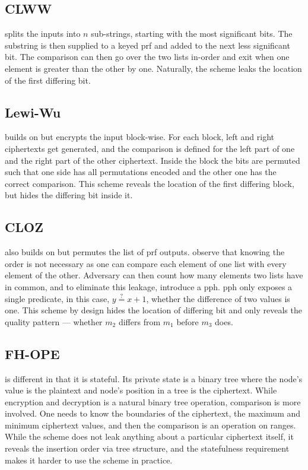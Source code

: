		\subsection{CLWW}

			\cite{practical-ore} splits the inputs into $n$ sub-strings, starting with the most significant bits.
			The substring is then supplied to a keyed \gls{prf} and added to the next less significant bit.
			The comparison can then go over the two lists in-order and exit when one element is greater than the other by one.
			Naturally, the scheme leaks the location of the first differing bit.

		\subsection{Lewi-Wu}

			\cite{lewi-wu-ore} builds on \cite{practical-ore} but encrypts the input block-wise.
			For each block, left and right ciphertexts get generated, and the comparison is defined for the left part of one and the right part of the other ciphertext.
			Inside the block the bits are permuted such that one side has all permutations encoded and the other one has the correct comparison.
			This scheme reveals the location of the first differing block, but hides the differing bit inside it.

		\subsection{CLOZ}

			\cite{adam-ore-v2} also builds on \cite{practical-ore} but permutes the list of \gls{prf} outputs.
			\textcite{adam-ore-v2} observe that knowing the order is not necessary as one can compare each element of one list with every element of the other.
			Adversary can then count how many elements two lists have in common, and to eliminate this leakage, \textcite{adam-ore-v2} introduce a \gls{pph}.
			\gls{pph} only exposes a single predicate, in this case, $y \overset{?}{=} x + 1$, whether the difference of two values is one.
			This scheme by design hides the location of differing bit and  only reveals the quality pattern --- whether $m_2$ differs from $m_1$ before $m_3$ does.

		\subsection{FH-OPE}

			\cite{fh-ope} is different in that it is stateful.
			Its private state is a binary tree where the node's value is the plaintext and node's position in a tree is the ciphertext.
			While encryption and decryption is a natural binary tree operation, comparison is more involved.
			One needs to know the boundaries of the ciphertext, the maximum and minimum ciphertext values, and then the comparison is an operation on ranges.
			While the scheme does not leak anything about a particular ciphertext itself, it reveals the insertion order via tree structure, and the statefulness requirement makes it harder to use the scheme in practice.

